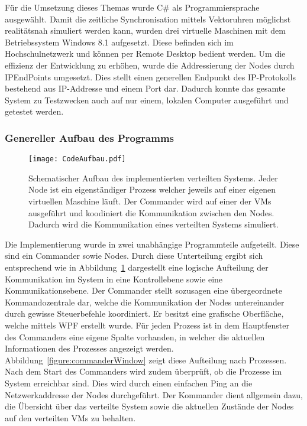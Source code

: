Für die Umsetzung dieses Themas wurde C\# als Programmiersprache ausgewählt. Damit die zeitliche Synchronisation mittels Vektoruhren möglichst realitätsnah simuliert werden kann, wurden drei virtuelle Maschinen mit dem Betriebssystem Windows 8.1 aufgesetzt. Diese befinden sich im Hochschulnetzwerk und können per Remote Desktop bedient werden. Um die effizienz der Entwicklung zu erhöhen, wurde die Addressierung der Nodes durch IPEndPoints umgesetzt. Dies stellt einen generellen Endpunkt des IP-Protokolls bestehend aus IP-Addresse und einem Port dar. Dadurch konnte das gesamte System zu Testzwecken auch auf nur einem, lokalen Computer ausgeführt und getestet werden.

\subsubsection{Genereller Aufbau des Programms}

\begin{figure}[ht]
	\centering
	\texttt{[image: CodeAufbau.pdf]}
	\caption[Aufbau der Anwendung]{Schematischer Aufbau des implementierten verteilten Systems. Jeder Node ist ein eigenständiger Prozess welcher jeweils auf einer eigenen virtuellen Maschine läuft. Der Commander wird auf einer der VMs ausgeführt und koodiniert die Kommunikation zwischen den Nodes. Dadurch wird die Kommunikation eines verteilten Systems simuliert.}
	\label{figure:systemaufbau}
\end{figure}

Die Implementierung wurde in zwei unabhängige Programmteile aufgeteilt. Diese sind ein Commander sowie Nodes. Durch diese Unterteilung ergibt sich entsprechend wie in Abbildung~\ref*{figure:systemaufbau} dargestellt eine logische Aufteilung der Kommunikation im System in eine Kontrollebene sowie eine Kommunikationsebene. Der Commander stellt sozusagen eine übergeordnete Kommandozentrale dar, welche die Kommunikation der Nodes untereinander durch gewisse Steuerbefehle koordiniert. Er besitzt eine grafische Oberfläche, welche mittels WPF erstellt wurde. Für jeden Prozess ist in dem Hauptfenster des Commanders eine eigene Spalte vorhanden, in welcher die aktuellen Informationen des Prozesses angezeigt werden. Abbildung~\ref{figure:commanderWindow} zeigt diese Aufteilung nach Prozessen. Nach dem Start des Commanders wird zudem überprüft, ob die Prozesse im System erreichbar sind. Dies wird durch einen einfachen Ping an die Netzwerkaddresse der Nodes durchgeführt. Der Kommander dient allgemein dazu, die Übersicht über das verteilte System sowie die aktuellen Zustände der Nodes auf den verteilten VMs zu behalten. 

